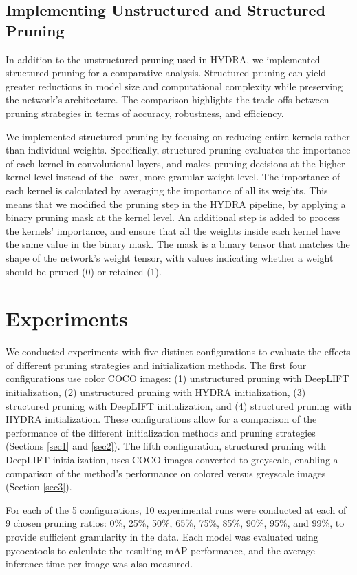 \documentclass[10pt]{cai}
\begin{document}
\subsection{Implementing Unstructured and Structured Pruning}
In addition to the unstructured pruning used in HYDRA, we implemented structured pruning for a comparative analysis. Structured pruning can yield greater reductions in model size and computational complexity while preserving the network's architecture. The comparison highlights the trade-offs between pruning strategies in terms of accuracy, robustness, and efficiency.

We implemented structured pruning by focusing on reducing entire kernels rather than individual weights. Specifically, structured pruning evaluates the importance of each kernel in convolutional layers, and makes pruning decisions at the higher kernel level instead of the lower, more granular weight level. The importance of each kernel is calculated by averaging the importance of all its weights. This means that we  modified the pruning step in the HYDRA pipeline, by applying a binary pruning mask at the kernel level. An additional step is added to process the kernels' importance, and ensure that all the weights inside each kernel have the same value in the binary mask. The mask is a binary tensor that matches the shape of the network's weight tensor, with values indicating whether a weight should be pruned (0) or retained (1).

\section{Experiments}
We conducted experiments with five distinct configurations to evaluate the effects of different pruning strategies and initialization methods. The first four configurations use color COCO images: (1) unstructured pruning with DeepLIFT initialization, (2) unstructured pruning with HYDRA initialization, (3) structured pruning with DeepLIFT initialization, and (4) structured pruning with HYDRA initialization. These configurations allow for a comparison of the performance of the different initialization methods and pruning strategies (Sections \ref{sec1} and \ref{sec2}). The fifth configuration, structured pruning with DeepLIFT initialization, uses COCO images converted to greyscale, enabling a comparison of the method's performance on colored versus greyscale images (Section \ref{sec3}).

For each of the 5 configurations, 10 experimental runs were conducted at each of 9 chosen pruning ratios: 0\%, 25\%, 50\%, 65\%, 75\%, 85\%, 90\%, 95\%, and 99\%, to provide sufficient granularity in the data. Each model was evaluated using pycocotools to calculate the resulting mAP performance, and the average inference time per image was also measured. 
\end{document}
